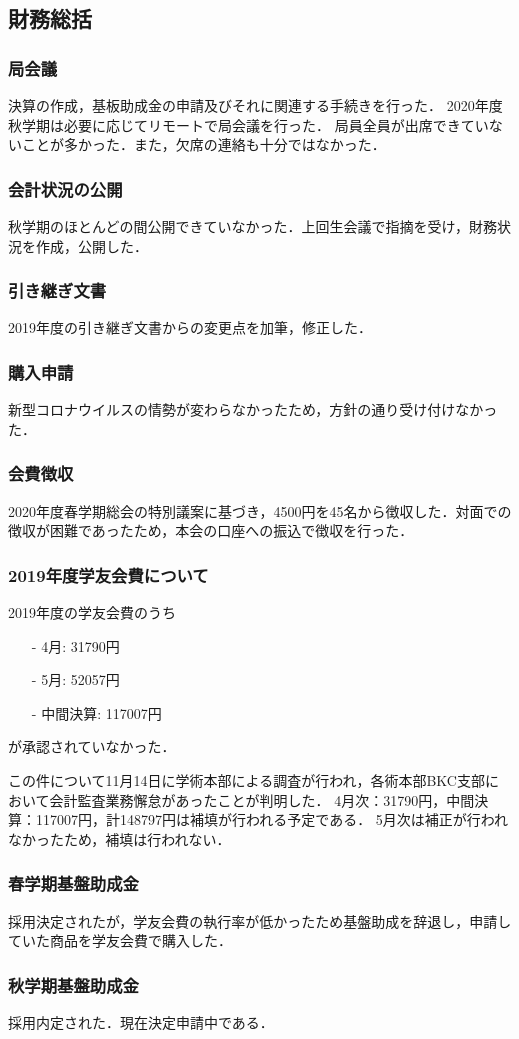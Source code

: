 \subsection*{財務総括}


\subsubsection*{局会議}
決算の作成，基板助成金の申請及びそれに関連する手続きを行った．
2020年度秋学期は必要に応じてリモートで局会議を行った．
局員全員が出席できていないことが多かった．また，欠席の連絡も十分ではなかった．


\subsubsection*{会計状況の公開}
秋学期のほとんどの間公開できていなかった．上回生会議で指摘を受け，財務状況を作成，公開した．


\subsubsection*{引き継ぎ文書}
2019年度の引き継ぎ文書からの変更点を加筆，修正した．


\subsubsection*{購入申請}
新型コロナウイルスの情勢が変わらなかったため，方針の通り受け付けなかった．


\subsubsection*{会費徴収}
2020年度春学期総会の特別議案に基づき，4500円を45名から徴収した．対面での徴収が困難であったため，本会の口座への振込で徴収を行った．


\subsubsection*{2019年度学友会費について}
2019年度の学友会費のうち
\begin{itemize}
	\item[-] 4月: 31790円
	\item[-] 5月: 52057円
	\item[-] 中間決算: 117007円
\end{itemize} 
が承認されていなかった．

この件について11月14日に学術本部による調査が行われ，各術本部BKC支部において会計監査業務懈怠があったことが判明した．
4月次：31790円，中間決算：117007円，計148797円は補填が行われる予定である．
5月次は補正が行われなかったため，補填は行われない．


\subsubsection*{春学期基盤助成金}
採用決定されたが，学友会費の執行率が低かったため基盤助成を辞退し，申請していた商品を学友会費で購入した．


\subsubsection*{秋学期基盤助成金}
採用内定された．現在決定申請中である．
